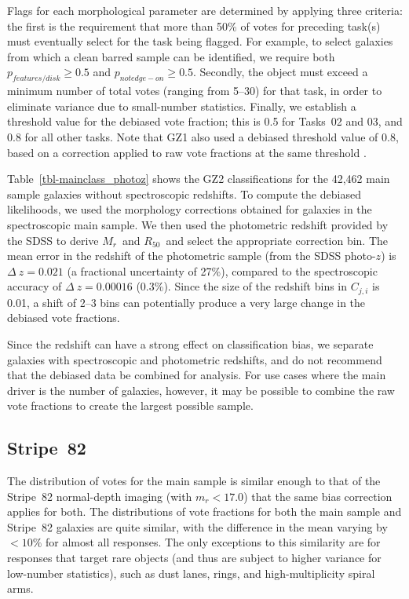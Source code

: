 \documentclass[useAMS,usenatbib]{mn2e}
\newcommand{\mr}{$M_r$}
\newcommand{\rfifty}{$R_{50}$}
\begin{document}
Flags for each morphological parameter are determined by applying three criteria: the first is the requirement that more than 50\% of votes for preceding task(s) must eventually select for the task being flagged. For example, to select galaxies from which a clean barred sample can be identified, we require both $p_{features/disk}\geq0.5$ and $p_{not edge-on}\geq0.5$. Secondly, the object must exceed a minimum number of total votes (ranging from 5--30) for that task, in order to eliminate variance due to small-number statistics. Finally, we establish a threshold value for the debiased vote fraction; this is 0.5 for Tasks~02 and 03, and 0.8 for all other tasks. Note that GZ1 also used a debiased threshold value of 0.8, based on a correction applied to raw vote fractions at the same threshold \citep{bam09,lin11}. 

Table~\ref{tbl-mainclass_photoz} shows the GZ2 classifications for the 42,462 main sample galaxies without spectroscopic redshifts. To compute the debiased likelihoods, we used the morphology corrections obtained for galaxies in the spectroscopic main sample. We then used the photometric redshift provided by the SDSS \citep{csa03} to derive \mr~and \rfifty~and select the appropriate correction bin. The mean error in the redshift of the photometric sample (from the SDSS photo-$z$) is $\Delta~z=0.021$ (a fractional uncertainty of 27\%), compared to the spectroscopic accuracy of $\Delta~z=0.00016$ (0.3\%). Since the size of the redshift bins in $C_{j,i}$ is 0.01, a shift of 2--3 bins can potentially produce a very large change in the debiased vote fractions. 

Since the redshift can have a strong effect on classification bias, we separate galaxies with spectroscopic and photometric redshifts, and do not recommend that the debiased data be combined for analysis. For use cases where the main driver is the number of galaxies, however, it may be possible to combine the raw vote fractions to create the largest possible sample.

\subsection{Stripe~82}\label{ssec-s82}

The distribution of votes for the main sample is similar enough to that of the Stripe~82 normal-depth imaging (with $m_r<17.0$) that the same bias correction applies for both. The distributions of vote fractions for both the main sample and Stripe~82 galaxies are quite similar, with the difference in the mean varying by $<10\%$ for almost all responses. The only exceptions to this similarity are for responses that target rare objects (and thus are subject to higher variance for low-number statistics), such as dust lanes, rings, and high-multiplicity spiral arms. 
\end{document}
